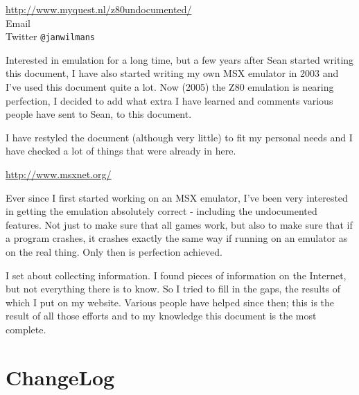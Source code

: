 \documentclass[12pt,twoside,openright,a4paper]{book}
\begin{document}
\begin{description}[style=unboxed,leftmargin=0cm]
	\item[Jan]\hfill
	
	\url{http://www.myquest.nl/z80undocumented/}\\
	Email \\
	Twitter {\tt @janwilmans}

	Interested in emulation for a long time, but a few years after Sean started writing this document, I have also started writing my own MSX emulator in 2003 and I've used this document quite a lot. Now (2005) the Z80 emulation is nearing perfection, I decided to add what extra I have learned and comments various people have sent to Sean, to this document.

	I have restyled the document (although very little) to fit my personal needs and I have checked a lot of things that were already in here.
 
	\item[Sean]\hfill

	\url{http://www.msxnet.org/}
	
	Ever since I first started working on an MSX emulator, I've been very interested in getting the emulation absolutely correct - including the undocumented features. Not just to make sure that all games work, but also to make sure that if a program crashes, it crashes exactly the same way if running on an emulator as on the real thing. Only then is perfection achieved.

	I set about collecting information. I found pieces of information on the Internet, but not everything there is to know. So I tried to fill in the gaps, the results of which I put on my website. Various people have helped since then; this is the result of all those efforts and to my knowledge this document is the most complete.
\end{description}


\pagebreak
\section{ChangeLog}
\end{document}
